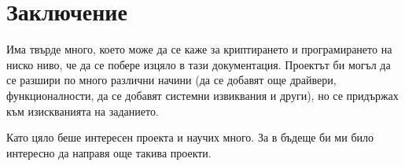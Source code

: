\section*{Заключение}
Има твърде много, което може да се каже за криптирането и програмирането на ниско ниво, че да се побере изцяло в тази документация.
Проектът би могъл да се разшири по много различни начини (да се добавят още драйвери, функционалности, да се добавят системни извиквания и други), но се придържах към изискванията на заданието.

Като цяло беше интересен проекта и научих много. За в бъдеще би ми било интересно да направя още такива проекти.


